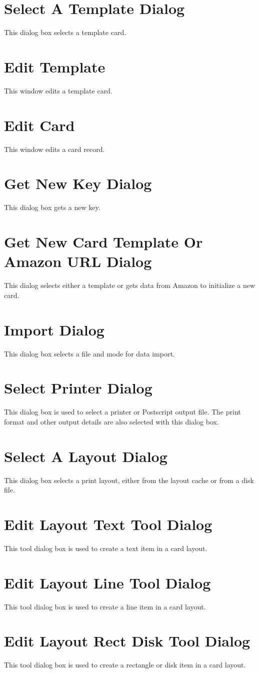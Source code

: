 \section{Select A Template Dialog}
This dialog box selects a template card.
\section{Edit Template}
This window edits a template card.
\section{Edit Card}
This window edits a card record.
\section{Get New Key Dialog}
This dialog box gets a new key.
\section{Get New Card Template Or Amazon URL Dialog}
This dialog selects either a template or gets data from Amazon to initialize 
a new card.
\section{Import Dialog}
This dialog box selects a file and mode for data import.
\section{Select Printer Dialog}
This dialog box is used to select a printer or Postscript output file.
The print format and other output details are also selected with this
dialog box.
\section{Select A Layout Dialog}
This dialog box selects a print layout, either from the layout cache or
from a disk file.
\section{Edit Layout Text Tool Dialog}
This tool dialog box is used to create a text item in a card layout.
\section{Edit Layout Line Tool Dialog}
This tool dialog box is used to create a line item in a card layout.
\section{Edit Layout Rect Disk Tool Dialog}
This tool dialog box is used to create a rectangle or disk item in a
card layout.
